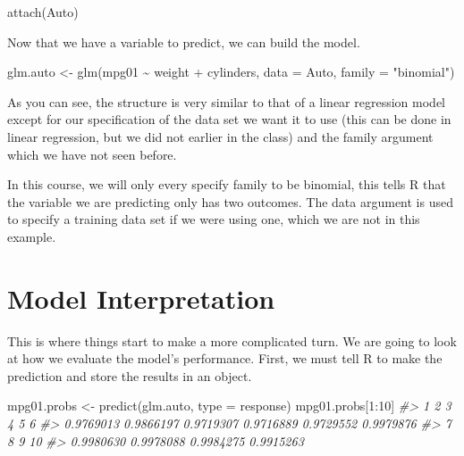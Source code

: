 \documentclass[
]{book}
\newenvironment{Shaded}{\begin{snugshade}}{\end{snugshade}}
\newcommand{\AttributeTok}[1]{\textcolor[rgb]{0.77,0.63,0.00}{#1}}
\newcommand{\CommentTok}[1]{\textcolor[rgb]{0.56,0.35,0.01}{\textit{#1}}}
\newcommand{\DecValTok}[1]{\textcolor[rgb]{0.00,0.00,0.81}{#1}}
\newcommand{\FunctionTok}[1]{\textcolor[rgb]{0.00,0.00,0.00}{#1}}
\newcommand{\NormalTok}[1]{#1}
\newcommand{\OtherTok}[1]{\textcolor[rgb]{0.56,0.35,0.01}{#1}}
\newcommand{\SpecialCharTok}[1]{\textcolor[rgb]{0.00,0.00,0.00}{#1}}
\newcommand{\StringTok}[1]{\textcolor[rgb]{0.31,0.60,0.02}{#1}}
\begin{document}
\begin{Shaded}
\begin{Highlighting}[]
\FunctionTok{attach}\NormalTok{(Auto)}
\end{Highlighting}
\end{Shaded}

Now that we have a variable to predict, we can build the model.

\begin{Shaded}
\begin{Highlighting}[]
\NormalTok{glm.auto }\OtherTok{\textless{}{-}} \FunctionTok{glm}\NormalTok{(mpg01 }\SpecialCharTok{\textasciitilde{}}\NormalTok{ weight }\SpecialCharTok{+}\NormalTok{ cylinders, }\AttributeTok{data =}\NormalTok{ Auto, }\AttributeTok{family =} \StringTok{"binomial"}\NormalTok{)}
\end{Highlighting}
\end{Shaded}

As you can see, the structure is very similar to that of a linear regression model except for our specification of the data set we want it to use (this can be done in linear regression, but we did not earlier in the class) and the family argument which we have not seen before.

In this course, we will only every specify family to be binomial, this tells R that the variable we are predicting only has two outcomes. The data argument is used to specify a training data set if we were using one, which we are not in this example.

\hypertarget{model-interpretation}{%
\section{Model Interpretation}\label{model-interpretation}}

This is where things start to make a more complicated turn. We are going to look at how we evaluate the model's performance. First, we must tell R to make the prediction and store the results in an object.

\begin{Shaded}
\begin{Highlighting}[]
\NormalTok{mpg01.probs }\OtherTok{\textless{}{-}} \FunctionTok{predict}\NormalTok{(glm.auto, }\AttributeTok{type =} \StringTok{\textquotesingle{}response\textquotesingle{}}\NormalTok{)}
\NormalTok{mpg01.probs[}\DecValTok{1}\SpecialCharTok{:}\DecValTok{10}\NormalTok{]}
\CommentTok{\#\textgreater{}         1         2         3         4         5         6 }
\CommentTok{\#\textgreater{} 0.9769013 0.9866197 0.9719307 0.9716889 0.9729552 0.9979876 }
\CommentTok{\#\textgreater{}         7         8         9        10 }
\CommentTok{\#\textgreater{} 0.9980630 0.9978088 0.9984275 0.9915263}
\end{Highlighting}
\end{Shaded}
\end{document}
